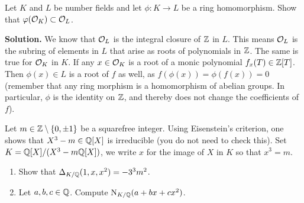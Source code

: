 \documentclass[a4paper,11pt]{article}
\begin{document}
Let $K$ and $L$ be number fields and let $\phi: K \to L$ be a ring homomorphism.
Show that $\varphi(\mathcal{O}_K) \subset \mathcal{O}_L$.

\textbf{Solution.} We know that $\mathcal{O}_L$ is the integral closure of $\mathbb{Z}$ in $L$. This
means $\mathcal{O}_L$ is the subring of elements in $L$ that arise as roots of polynomials
in $\mathbb{Z}$. The same is true for $\mathcal{O}_K$ in $K$. If any $x \in \mathcal{O}_K$ is a root of a
monic polynomial $f_x(T) \in \mathbb{Z}[T]$. Then $\phi(x) \in L$ is a root of $f$ as well,
as $f(\phi(x)) = \phi(f(x)) = 0$ (remember that any ring morphism is a
homomorphism of abelian groups. In particular, $\phi$ is the identity
on $\mathbb{Z}$, and thereby does not change the coefficients of $f$).

Let $m \in \mathbb{Z} \setminus \{0, \pm 1\}$ be a squarefree integer. Using Eisenstein's
criterion, one shows that $X^3 -m \in \mathbb{Q}[X]$ is irreducible (you do not need to check
this). Set $K = \mathbb{Q}[X]/(X^3-m \mathbb{Q}[X])$, we write $x$ for the image of $X$ in $K$
so that $x^3 = m$. 
\begin{enumerate}
    \item Show that $\Delta_{K/\mathbb{Q}}(1,x,x^2) = -3^3 m^2$.
    \item Let $a,b,c \in \mathbb{Q}$. Compute $\operatorname{N}_{K/\mathbb{Q}}(a + bx + cx^2)$.
\end{enumerate}
\end{document}
